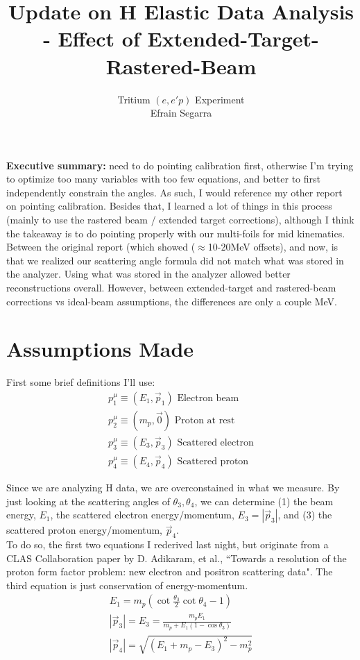 \documentclass{article}
\title{Update on H Elastic Data Analysis - Effect of Extended-Target-Rastered-Beam}
\author{Tritium $(e,e'p)$ Experiment\\Efrain Segarra}
\begin{document}
\maketitle

\textbf{Executive summary:} need to do pointing calibration first, otherwise I'm trying to optimize too many variables with too few equations, and better to first independently constrain the angles. As such, I would reference my other report on pointing calibration. Besides that, I learned a lot of things in this process (mainly to use the rastered beam / extended target corrections), although I think the takeaway is to do pointing properly with our multi-foils for mid kinematics. Between the original report (which showed ($\approx$10-20MeV offsets), and now, is that we realized our scattering angle formula did not match what was stored in the analyzer. Using what was stored in the analyzer allowed better reconstructions overall. However, between extended-target and rastered-beam corrections vs ideal-beam assumptions, the differences are only a couple MeV. 


\section*{Assumptions Made}
First some brief definitions I'll use:
\begin{equation*}
	\begin{gathered}
		p_1^\mu \equiv (E_1,\vec{p}_1)	\textrm{     Electron beam}	\\
		p_2^\mu \equiv (m_p,\vec{0} )	\textrm{     Proton at rest}	\\
		p_3^\mu \equiv (E_3,\vec{p}_3)	\textrm{     Scattered electron}	\\
		p_4^\mu \equiv (E_4,\vec{p}_4)		\textrm{     Scattered proton}
	\end{gathered}
\end{equation*}

Since we are analyzing H data, we are overconstained in what we measure. By just looking at the scattering angles of $\theta_3,\theta_4$, we can determine (1) the beam energy, $E_1$, the scattered electron energy/momentum, $E_3=|\vec{p}_3|$, and (3) the scattered proton energy/momentum, $\vec{p}_4$.\\		

To do so, the first two equations I rederived last night, but originate from a CLAS Collaboration paper by D. Adikaram, et al., ``Towards a resolution of the proton form factor problem: new electron and positron scattering data". The third equation is just conservation of energy-momentum.\\
\begin{equation*}
	\begin{gathered}
		E_1 = m_p ( \cot{\frac{\theta_3}{2}} \cot{\theta_4} - 1 )	\\
		|\vec{p}_3| = E_3 = \frac{ m_p E_1 }{ m_p + E_1 (1-\cos{\theta_3} )}	\\
		|\vec{p}_4| = \sqrt{(E_1 + m_p - E_3)^2 - m_p^2}
	\end{gathered}
\end{equation*}
\end{document}
